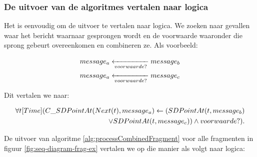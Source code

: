 \subsubsection{De uitvoer van de algoritmes vertalen naar logica}

Het is eenvoudig om de uitvoer te vertalen naar logica. We zoeken naar gevallen waar het bericht waarnaar gesprongen wordt en de voorwaarde waaronder die sprong gebeurt overeenkomen en combineren ze. Als voorbeeld:

\begin{align*}
	&\transitionentry[\fragmessage{$message_b$}]{\fragcond{voorwaarde}}{\fragmessage{$message_a$}} \\
	&\transitionentry[\fragmessage{$message_c$}]{\fragcond{voorwaarde}}{\fragmessage{$message_a$}}
\end{align*}

Dit vertalen we naar:

\begin{align*}
	\forall{t}[Time](C\_SDPointAt(Next(t), message_a) \leftarrow (SDPointAt(t, message_b) \\ \lor SDPointAt(t, message_c)) \land voorwaarde?).
\end{align*}

De uitvoer van algoritme \ref{alg:processCombinedFragment} voor alle fragmenten in figuur \ref{fig:seq-diagram-frag-ex} vertalen we op die manier als volgt naar logica:

